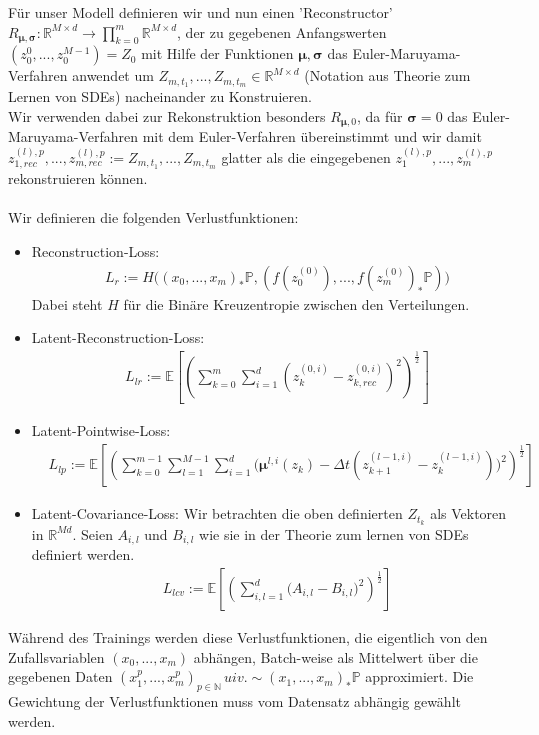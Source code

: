 \documentclass[12pt]{article}
\newcommand{\E}{\mathbb{E}}
\newcommand{\R}{\mathbb{R}}
\newcommand{\bP}{\mathbb{P}}
\newcommand{\bmu}{\bm{\mu}}
\newcommand{\bsig}{\bm{\sigma}}
\newcommand{\N}{\mathbb{N}}
\begin{document}
	Für unser Modell definieren wir und nun einen 'Reconstructor' $R_{\bmu,\bsig} : \R^{M \times d} \rightarrow \prod\limits_{k=0}^m \R^{M \times d}$, der zu gegebenen Anfangswerten $(z^{0}_0,...,z^{M-1}_0) = Z_0$ mit Hilfe der Funktionen $\bmu, \bsig$ das Euler-Maruyama-Verfahren anwendet um $Z_{m,t_1},...,Z_{m,t_m} \in \R^{M \times d}$ (Notation aus Theorie zum Lernen von SDEs) nacheinander zu Konstruieren.\\
	Wir verwenden dabei zur Rekonstruktion besonders $R_{\bmu,0}$, da für $\bsig = 0$ das Euler-Maruyama-Verfahren mit dem Euler-Verfahren übereinstimmt und wir damit $z_{1,rec}^{(l),p},...,z_{m,rec}^{(l),p} := Z_{m,t_1},...,Z_{m,t_m}$ glatter als die eingegebenen $z_1^{(l),p},...,z_m^{(l),p}$ rekonstruieren können.\\
	\\
	Wir definieren die folgenden Verlustfunktionen:
	\begin{itemize}
		\item Reconstruction-Loss:
		\begin{align*}
		& L_r := H\big((x_0,...,x_m)_*\bP, (f(z_0^{(0)}),...,f(z_m^{(0)})_*\bP)\big)
		\end{align*}
		Dabei steht $H$ für die Binäre Kreuzentropie zwischen den Verteilungen.
		
		\item Latent-Reconstruction-Loss:
		\begin{align*}
		& L_{lr} := \E\left[\left( \sum\limits_{k=0}^m \sum\limits_{i=1}^d (z^{(0,i)}_k-z^{(0,i)}_{k,rec})^2 \right)^{\frac{1}{2}}\right]
		\end{align*}
		
		\item Latent-Pointwise-Loss:
		\begin{align*}
		& L_{lp} := \E\left[\left( \sum\limits_{k=0}^{m-1} \sum\limits_{l=1}^{M-1} \sum\limits_{i=1}^d \big(\bmu^{l,i}(z_k) - \Delta t (z^{(l-1,i)}_{k+1} - z^{(l-1,i)}_{k}) \big)^2 \right)^{\frac{1}{2}}\right]
		\end{align*}
		
		\item Latent-Covariance-Loss:
		Wir betrachten die oben definierten $Z_{t_k}$ als Vektoren in $\R^{Md}$. Seien $A_{i,l}$ und $B_{i,l}$ wie sie in der Theorie zum lernen von SDEs definiert werden.
		\begin{align*}
		& L_{lcv} := \E\left[\left( \sum\limits_{i,l=1}^d \big( A_{i,l}-B_{i,l} \big)^2 \right)^{\frac{1}{2}}\right]
		\end{align*}
		
		
	\end{itemize}
	Während des Trainings werden diese Verlustfunktionen, die eigentlich von den Zufallsvariablen $(x_0,...,x_m)$ abhängen, Batch-weise als Mittelwert über die gegebenen Daten $(x_1^p,...,x_m^p)_{p \in \N}\, uiv. \sim (x_1,...,x_m)_*\bP$ approximiert. Die Gewichtung der Verlustfunktionen muss vom Datensatz abhängig gewählt werden. 
	
\end{document}
